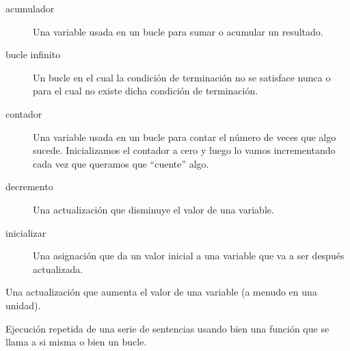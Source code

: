 \begin{description}
\item[acumulador]
Una variable usada en un bucle para sumar o acumular un resultado.
\end{description}


\begin{description}
\item[bucle infinito]
Un bucle en el cual la condición de terminación no se satisface nunca o
para el cual no existe dicha condición de terminación.
\end{description}

 

\begin{description}
\item[contador]
Una variable usada en un bucle para contar el número de veces que algo
sucede. Inicializamos el contador a cero y luego lo vamos incrementando
cada vez que queramos que ``cuente'' algo.
\end{description}


\begin{description}
\item[decremento]
Una actualización que disminuye el valor de una variable.
\end{description}


\begin{description}
\item[inicializar]
Una asignación que da un valor inicial a una variable que va a ser
después actualizada.
\end{description}


\begin{description}
\tightlist
\item[incremento]
Una actualización que aumenta el valor de una variable (a menudo en una
unidad).
\end{description}


\begin{description}
\tightlist
\item[iteración]
Ejecución repetida de una serie de sentencias usando bien una función
que se llama a si misma o bien un bucle.
\end{description}


